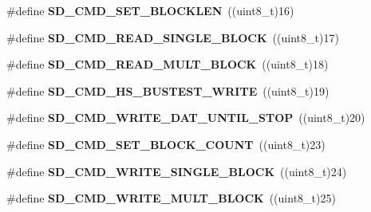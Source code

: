 \begin{DoxyCompactItemize}
\item 
\#define {\bfseries S\+D\+\_\+\+C\+M\+D\+\_\+\+S\+E\+T\+\_\+\+B\+L\+O\+C\+K\+L\+EN}~((uint8\+\_\+t)16)\hypertarget{group__sd__card_ga77edc6b67b0921f4473adc7b95039de3}{}\label{group__sd__card_ga77edc6b67b0921f4473adc7b95039de3}

\item 
\#define {\bfseries S\+D\+\_\+\+C\+M\+D\+\_\+\+R\+E\+A\+D\+\_\+\+S\+I\+N\+G\+L\+E\+\_\+\+B\+L\+O\+CK}~((uint8\+\_\+t)17)\hypertarget{group__sd__card_ga8a0361bd4864fe9368ba54bc9b2bda24}{}\label{group__sd__card_ga8a0361bd4864fe9368ba54bc9b2bda24}

\item 
\#define {\bfseries S\+D\+\_\+\+C\+M\+D\+\_\+\+R\+E\+A\+D\+\_\+\+M\+U\+L\+T\+\_\+\+B\+L\+O\+CK}~((uint8\+\_\+t)18)\hypertarget{group__sd__card_gafedc6b182681752a4299dffdd1ce74da}{}\label{group__sd__card_gafedc6b182681752a4299dffdd1ce74da}

\item 
\#define {\bfseries S\+D\+\_\+\+C\+M\+D\+\_\+\+H\+S\+\_\+\+B\+U\+S\+T\+E\+S\+T\+\_\+\+W\+R\+I\+TE}~((uint8\+\_\+t)19)\hypertarget{group__sd__card_ga2bc9f60a2cc409365a49862d8551349e}{}\label{group__sd__card_ga2bc9f60a2cc409365a49862d8551349e}

\item 
\#define {\bfseries S\+D\+\_\+\+C\+M\+D\+\_\+\+W\+R\+I\+T\+E\+\_\+\+D\+A\+T\+\_\+\+U\+N\+T\+I\+L\+\_\+\+S\+T\+OP}~((uint8\+\_\+t)20)\hypertarget{group__sd__card_ga6478634540db1fa3fcd044315d1238b5}{}\label{group__sd__card_ga6478634540db1fa3fcd044315d1238b5}

\item 
\#define {\bfseries S\+D\+\_\+\+C\+M\+D\+\_\+\+S\+E\+T\+\_\+\+B\+L\+O\+C\+K\+\_\+\+C\+O\+U\+NT}~((uint8\+\_\+t)23)\hypertarget{group__sd__card_ga5dd52de3e95163402a5cd995620d4d01}{}\label{group__sd__card_ga5dd52de3e95163402a5cd995620d4d01}

\item 
\#define {\bfseries S\+D\+\_\+\+C\+M\+D\+\_\+\+W\+R\+I\+T\+E\+\_\+\+S\+I\+N\+G\+L\+E\+\_\+\+B\+L\+O\+CK}~((uint8\+\_\+t)24)\hypertarget{group__sd__card_ga20a1c8427ec19835fe2782ec8febd5ca}{}\label{group__sd__card_ga20a1c8427ec19835fe2782ec8febd5ca}

\item 
\#define {\bfseries S\+D\+\_\+\+C\+M\+D\+\_\+\+W\+R\+I\+T\+E\+\_\+\+M\+U\+L\+T\+\_\+\+B\+L\+O\+CK}~((uint8\+\_\+t)25)\hypertarget{group__sd__card_gafe82a884b2692654c9862bb25b8706ce}{}\label{group__sd__card_gafe82a884b2692654c9862bb25b8706ce}


\end{DoxyCompactItemize}

